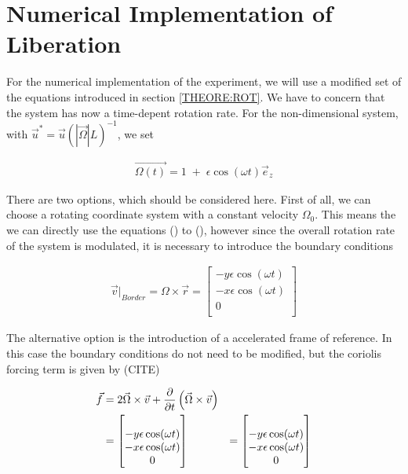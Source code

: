 \newpage

\section{Numerical Implementation of Liberation}

For the numerical implementation of the experiment, we will use a modified set of the equations
introduced in section \ref{THEORE:ROT}.
We have to concern that the system has now a time-depent rotation rate.
For the non-dimensional system, with $\vec{u}^* =  \vec{u} (|\vec{\Omega}|L)^{-1}$, we set

\begin{align}
    \vec{\Omega(t)} = 1 \; + \; \epsilon \cos(\omega t)\vec{e}_z
\end{align}

There are two options, which should be considered here.
First of all, we can choose a rotating coordinate system with a constant velocity $\Omega_0$.
This means the we can directly use the equations () to (), however since the overall rotation rate of the system is
modulated, it is necessary to introduce the boundary conditions

\begin{align}
    \vec{v}|_{Border}  = \Omega \times \vec{r} = \begin{bmatrix}
           -y \epsilon \cos(\omega t) \\
           -x \epsilon \cos(\omega t) \\
           0\\
         \end{bmatrix}
\end{align}

The alternative option is the introduction of a accelerated frame of reference.
In this case the boundary conditions do not need to be modified, but the coriolis forcing term is given by (CITE)

\begin{align}
    \vec{f} &= 2 \vec{\Omega} \times \vec{v} + \pdn[]{t}\left(\vec{\Omega} \times \vec{v} \right) \\
            &= \begin{bmatrix}\\
           -y \epsilon \cos(\omega t) \\
           -x \epsilon \cos(\omega t) \\
           0\\
         \end{bmatrix}
            &= \begin{bmatrix}\\
           -y \epsilon \cos(\omega t) \\
           -x \epsilon \cos(\omega t) \\
           0\\
         \end{bmatrix}
\end{align}

